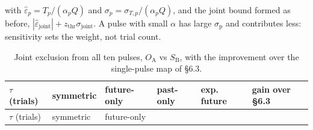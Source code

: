 \documentclass[
  11pt,
]{article}
\begin{document}
with \(\hat\varepsilon_p = T_p/(\alpha_p Q)\) and
\(\sigma_p = \sigma_{T,p}/(\alpha_p Q)\), and the joint bound formed as
before,
\(|\hat\varepsilon_{\mathrm{joint}}| + z_{\mathrm{thr}}\sigma_{\mathrm{joint}}\).
A pulse with small \(\alpha\) has large \(\sigma_{\mathrm{p}}\) and
contributes less: sensitivity sets the weight, not trial count.

\begin{longtable}[]{@{}
  >{\raggedright\arraybackslash}p{}
  >{\raggedright\arraybackslash}p{}
  >{\raggedright\arraybackslash}p{}
  >{\raggedright\arraybackslash}p{}
  >{\raggedright\arraybackslash}p{}
  >{\raggedright\arraybackslash}p{}@{}}
\caption{Joint exclusion from all ten pulses, \(O_{\mathrm{A}}\) vs
\(S_{\mathrm{B}}\), with the improvement over the single-pulse map of
\S6.3.}\tabularnewline
\toprule\noalign{}
\begin{minipage}[b]{\linewidth}\raggedright
\(\tau\) (trials)
\end{minipage} & \begin{minipage}[b]{\linewidth}\raggedright
symmetric
\end{minipage} & \begin{minipage}[b]{\linewidth}\raggedright
future-only
\end{minipage} & \begin{minipage}[b]{\linewidth}\raggedright
past-only
\end{minipage} & \begin{minipage}[b]{\linewidth}\raggedright
exp. future
\end{minipage} & \begin{minipage}[b]{\linewidth}\raggedright
gain over \S6.3
\end{minipage} \\
\midrule\noalign{}
\endfirsthead
\toprule\noalign{}
\begin{minipage}[b]{\linewidth}\raggedright
\(\tau\) (trials)
\end{minipage} & \begin{minipage}[b]{\linewidth}\raggedright
symmetric
\end{minipage} & \begin{minipage}[b]{\linewidth}\raggedright
future-only
\end{minipage} & \begin{minipage}[b]{\linewidth}\raggedright

\end{minipage}
\end{longtable}
\end{document}
